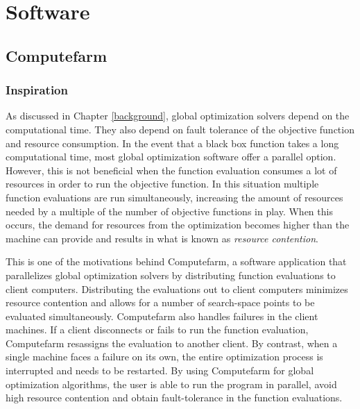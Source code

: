 \chapter{Software}
\label{methods}
\section{Computefarm}
\label{computefarm}
\subsection{Inspiration}
As discussed in Chapter \ref{background}, global optimization solvers depend on the computational time. They also depend on fault tolerance of the objective function and resource consumption. In the event that a black box function takes a long computational time, most global optimization software offer a parallel option. However, this is not beneficial when the function evaluation consumes a lot of resources in order to run the objective function. In this situation multiple function evaluations are run simultaneously, increasing the amount of resources needed by a multiple of the number of objective functions in play. When this occurs, the demand for resources from the optimization becomes higher than the machine can provide and results in what is known as \textit{resource contention}. 


This is one of the motivations behind Computefarm, a software application that parallelizes global optimization solvers by distributing function evaluations to client computers. Distributing the evaluations out to client computers minimizes resource contention and allows for a number of search-space points to be evaluated simultaneously. Computefarm also handles failures in the client machines. If a client disconnects or fails to run the function evaluation, Computefarm resassigns the evaluation to another client. By contrast, when a single machine faces a failure on its own, the entire optimization process is interrupted and needs to be restarted. By using Computefarm for global optimization algorithms, the user is able to run the program in parallel, avoid high resource contention and obtain fault-tolerance in the function evaluations.   
  
